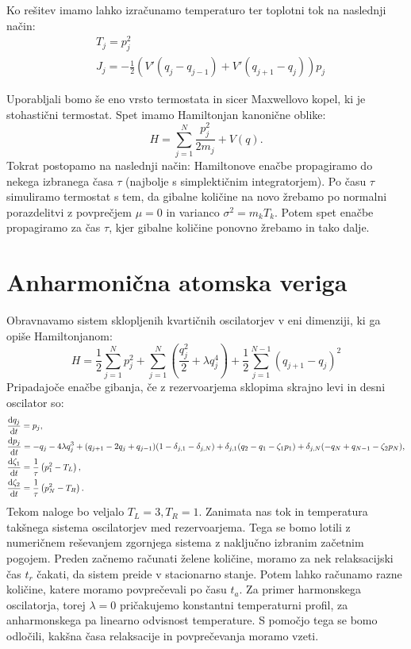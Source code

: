 \documentclass{article}
\begin{document}
Ko rešitev imamo lahko izračunamo temperaturo ter toplotni tok na naslednji način:
\begin{align*}
&T_j = p_j^2 \\
&J_j = -\frac{1}{2} \left( V' (q_j - q_{j-1}) + V'(q_{j+1}-q_j) \right) p_j
\end{align*} 

Uporabljali bomo še eno vrsto termostata in sicer Maxwellovo kopel, ki je stohastični termostat.
Spet imamo Hamiltonjan kanonične oblike:
\begin{equation*}
H = \sum_{j=1}^N \frac{p_j^2}{2 m_j} + V(q).
\end{equation*}
Tokrat postopamo na naslednji način: Hamiltonove enačbe propagiramo do nekega izbranega časa $\tau$ (najbolje s simplektičnim integratorjem). Po času $\tau$ simuliramo termostat s tem, da gibalne količine na novo žrebamo po normalni porazdelitvi z povprečjem $\mu=0$ in varianco $\sigma^2 = m_k T_k$. Potem spet enačbe propagiramo za čas $\tau$, kjer gibalne količine ponovno žrebamo in tako dalje.

\section*{Anharmonična atomska veriga}

Obravnavamo sistem sklopljenih kvartičnih oscilatorjev v eni dimenziji, ki ga opiše Hamiltonjanom:
\begin{equation*}
H = \frac{1}{2} \sum_{j=1}^N p_j^2 + \sum_{j=1}^N\left( \frac{q_j^2}{2} + \lambda q_j^4  \right) + \frac{1}{2} \sum_{j=1}^{N-1} (q_{j+1} - q_j)^2  
\end{equation*}
Pripadajoče enačbe gibanja, če z rezervoarjema sklopima skrajno levi in desni oscilator so:
\begin{align*}
&\frac{\textup{d} q_j}{\textup{d}t} = p_j, \\
&\frac{\textup{d}p_j}{\textup{d}t} = - q_j - 4 \lambda q_j^3 +  (q_{j+1}-2 q_j+ q_{j-1}) (1-\delta_{j,1}-\delta_{j,N})  + \delta_{j,1} (q_2-q_1 -\zeta_1 p_1) + \delta_{j,N} (-q_N + q_{N-1} - \zeta_2 p_N), \\
&\frac{\textup{d} \zeta_1}{\textup{d}t} = \frac{1}{\tau} \left(  p_1^2 -  T_L \right), \\
&\frac{\textup{d} \zeta_2}{\textup{d}t} = \frac{1}{\tau} \left(  p_N^2 -  T_R \right).
\end{align*}
Tekom naloge bo veljalo $T_L = 3, T_R = 1$.
Zanimata nas tok in temperatura takšnega sistema oscilatorjev med rezervoarjema. Tega se bomo lotili z numeričnem reševanjem zgornjega sistema z naključno izbranim začetnim pogojem. Preden začnemo računati želene količine, moramo za nek relaksacijski čas $t_r$ čakati, da sistem preide v stacionarno stanje. Potem lahko računamo razne količine, katere moramo povprečevali po času $t_a$.
Za primer harmonskega oscilatorja, torej $\lambda=0$ pričakujemo konstantni temperaturni profil, za anharmonskega pa linearno odvisnost temperature. S pomočjo tega se bomo odločili, kakšna časa relaksacije in povprečevanja moramo vzeti.
\end{document}
